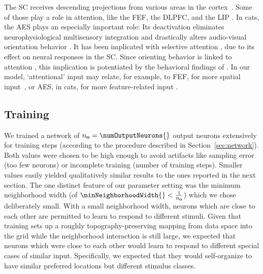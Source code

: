         The \ac{SC} receives descending projections from various areas in the cortex~\citep{wallace-and-stein-1994,berson-1988,stein-et-al-2014,may-2005,ferraina-et-al-2002,chabot-et-al-2013}.
        Some of those play a role in attention, like the \ac{FEF}, the \ac{DLPFC}, and the \ac{LIP} \citep{buschman-and-miller-2007,kastner-and-ungerleider-2000}.
        In cats, the \ac{AES} plays an especially important role: Its deactivation eliminates neurophysiological multisensory integration \citep{wallace-and-stein-1994} and drastically alters audio-visual orientation behavior \citep{wilkinson-et-al-1996}.
        It has been implicated with selective attention \citep{dehner-et-al-2004,foxe-2012}, due to its effect on neural responses in the \ac{SC}.
        Since orienting behavior is linked to attention \citep[more recently]{kustov-and-robinson-1996,ignashchenkova-et-al-2004}, this implication is potentiated by the behavioral findings of \citet{wallace-and-stein-1994}.
        In our model, `attentional' input may relate, for example, to \ac{FEF}, for more spatial input~\citep{bruce-et-al-1985}, or \ac{AES}, in cats, for more feature-related input \citep{dehner-et-al-2004}.

    \subsection{Training}
        We trained a network of $n_\neuron{o}=\numOutputNeurons{}$ output neurons extensively for \numStepsTraining{} training steps (according to the procedure described in Section~\ref{sec:network}).
        Both values were chosen to be high enough to avoid artifacts like sampling error (too few neurons) or incomplete training (number of training steps).
        Smaller values easily yielded qualitatively similar results to the ones reported in the next section.
        The one distinct feature of our parameter setting was the minimum neighborhood width (of $\minNeighborhoodWidth{}<\frac{1}{n_\neuron{o}}$) which we chose deliberately small.
        With a small neighborhood width, neurons which are close to each other are permitted to learn to respond to different stimuli.
        Given that training sets up a roughly topography-preserving mapping from data space into the grid while the neighborhood interaction is still large, we expected that neurons which were close to each other would learn to respond to different special cases of similar input.
        Specifically, we expected that they would self-organize to have similar preferred locations but different stimulus classes.

